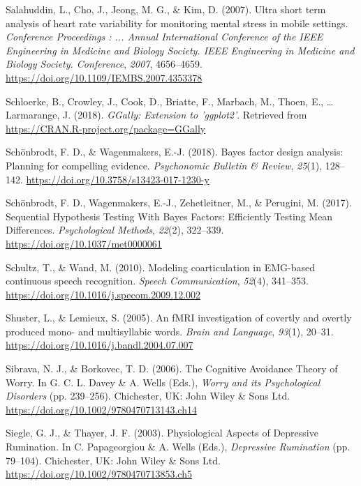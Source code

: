 \documentclass[a4paper,12pt,twoside,openright,oldfontcommands]{memoir}
\begin{document}
\leavevmode\hypertarget{ref-Salahuddin2007}{}%
Salahuddin, L., Cho, J., Jeong, M. G., \& Kim, D. (2007). Ultra short term analysis of heart rate variability for monitoring mental stress in mobile settings. \emph{Conference Proceedings : ... Annual International Conference of the IEEE Engineering in Medicine and Biology Society. IEEE Engineering in Medicine and Biology Society. Conference}, \emph{2007}, 4656--4659. \url{https://doi.org/10.1109/IEMBS.2007.4353378}

\leavevmode\hypertarget{ref-R-GGally}{}%
Schloerke, B., Crowley, J., Cook, D., Briatte, F., Marbach, M., Thoen, E., \ldots{} Larmarange, J. (2018). \emph{GGally: Extension to 'ggplot2'}. Retrieved from \url{https://CRAN.R-project.org/package=GGally}

\leavevmode\hypertarget{ref-schonbrodt_bayes_2018}{}%
Schönbrodt, F. D., \& Wagenmakers, E.-J. (2018). Bayes factor design analysis: Planning for compelling evidence. \emph{Psychonomic Bulletin \& Review}, \emph{25}(1), 128--142. \url{https://doi.org/10.3758/s13423-017-1230-y}

\leavevmode\hypertarget{ref-schonbrodt_sequential_2017}{}%
Schönbrodt, F. D., Wagenmakers, E.-J., Zehetleitner, M., \& Perugini, M. (2017). Sequential Hypothesis Testing With Bayes Factors: Efficiently Testing Mean Differences. \emph{Psychological Methods}, \emph{22}(2), 322--339. \url{https://doi.org/10.1037/met0000061}

\leavevmode\hypertarget{ref-schultz_modeling_2010}{}%
Schultz, T., \& Wand, M. (2010). Modeling coarticulation in EMG-based continuous speech recognition. \emph{Speech Communication}, \emph{52}(4), 341--353. \url{https://doi.org/10.1016/j.specom.2009.12.002}

\leavevmode\hypertarget{ref-shuster_fmri_2005}{}%
Shuster, L., \& Lemieux, S. (2005). An fMRI investigation of covertly and overtly produced mono- and multisyllabic words. \emph{Brain and Language}, \emph{93}(1), 20--31. \url{https://doi.org/10.1016/j.bandl.2004.07.007}

\leavevmode\hypertarget{ref-davey_cognitive_2006}{}%
Sibrava, N. J., \& Borkovec, T. D. (2006). The Cognitive Avoidance Theory of Worry. In G. C. L. Davey \& A. Wells (Eds.), \emph{Worry and its Psychological Disorders} (pp. 239--256). Chichester, UK: John Wiley \& Sons Ltd. \url{https://doi.org/10.1002/9780470713143.ch14}

\leavevmode\hypertarget{ref-papageorgiou_physiological_2003}{}%
Siegle, G. J., \& Thayer, J. F. (2003). Physiological Aspects of Depressive Rumination. In C. Papageorgiou \& A. Wells (Eds.), \emph{Depressive Rumination} (pp. 79--104). Chichester, UK: John Wiley \& Sons Ltd. \url{https://doi.org/10.1002/9780470713853.ch5}
\end{document}

